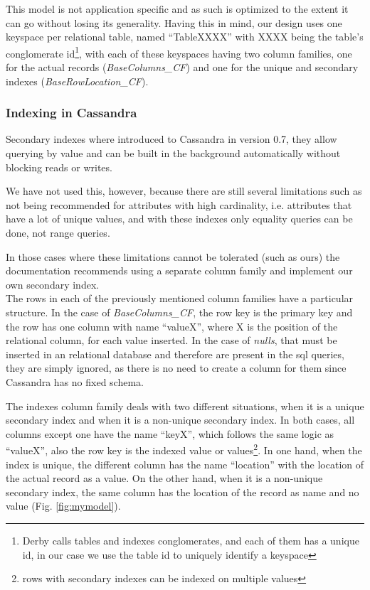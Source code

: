 This model is not application specific and as such is optimized to the extent it can go without losing its generality. Having this in mind, our design uses one keyspace per relational table, named ``TableXXXX'' with XXXX being the table's conglomerate id\footnote{Derby calls tables and indexes conglomerates, and each of them has a unique id, in our case we use the table id to uniquely identify a keyspace}, with each of these keyspaces having two column families, one for the actual records (\emph{BaseColumns\_CF}) and one for the unique and secondary indexes (\emph{BaseRowLocation\_CF}).

\subsubsection{Indexing in Cassandra}
Secondary indexes where introduced to Cassandra in version 0.7, they allow querying by value and can be built in the background automatically without blocking reads or writes. 

We have not used this, however, because there are still several limitations such as not being recommended for attributes with high cardinality, i.e. attributes that have a lot of unique values, and with these indexes only equality queries can be done, not range queries\cite{secindexlimitations}.

In those cases where these limitations cannot be tolerated (such as ours) the documentation recommends using a separate column family and implement our own secondary index\cite{secindex}. \\ 

The rows in each of the previously mentioned column families have a particular structure. In the case of \emph{BaseColumns\_CF}, the row key is the primary key and the row has one column with name ``valueX'', where X is the position of the relational column, for each value inserted. In the case of \emph{nulls}, that must be inserted in an relational database and therefore are present in the \ac{sql} queries, they are simply ignored, as there is no need to create a column for them since Cassandra has no fixed schema.  

The indexes column family deals with two different situations, when it is a unique secondary index and when it is a non-unique secondary index. In both cases, all columns except one have the name ``keyX'', which follows the same logic as ``valueX'', also the row key is the indexed value or values\footnote{rows with secondary indexes can be indexed on multiple values}. In one hand, when the index is unique, the different column has the name ``location'' with the location of the actual record as a value. On the other hand, when it is a non-unique secondary index, the same column has the location of the record as name and no value (Fig. \ref{fig:mymodel}).

